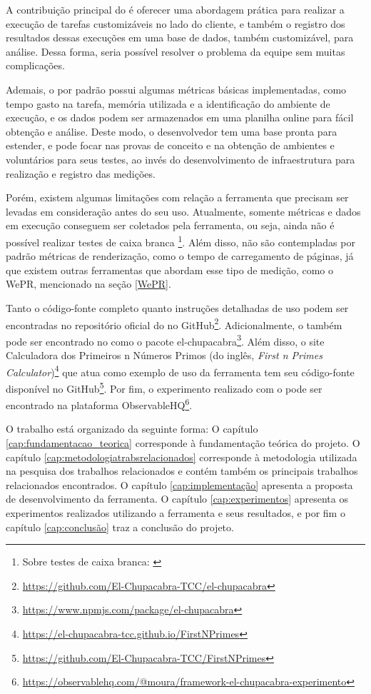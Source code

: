 \documentclass[12pt]{tcc}
\begin{document}
	A contribuição principal do  é oferecer uma abordagem prática para realizar a execução de tarefas customizáveis no lado do cliente, e também o registro dos resultados dessas execuções em uma base de dados, também customizável, para análise. Dessa forma, seria possível resolver o problema da equipe sem muitas complicações. 

	Ademais, o  por padrão possui algumas métricas básicas implementadas, como tempo gasto na tarefa, memória utilizada e a identificação do ambiente de execução, e os dados podem ser armazenados em uma planilha online para fácil obtenção e análise. Deste modo, o desenvolvedor tem uma base pronta para estender, e pode focar nas provas de conceito e na obtenção de ambientes e voluntários para seus testes, ao invés do desenvolvimento de infraestrutura para realização e registro das medições.

	Porém, existem algumas limitações com relação a ferramenta que precisam ser levadas em consideração antes do seu uso. Atualmente, somente métricas e dados em execução conseguem ser coletados pela ferramenta, ou seja, ainda não é possível realizar testes de caixa branca \footnote{Sobre testes de caixa branca: \citep[Capítulo 21]{Sommerville2015Software}}. Além disso, não são contempladas por padrão métricas de renderização, como o tempo de carregamento de páginas, já que existem outras ferramentas que abordam esse tipo de medição, como o WePR, mencionado na seção \ref{WePR}.

	Tanto o código-fonte completo quanto instruções detalhadas de uso podem ser encontradas no repositório oficial do  no GitHub\footnote{\url{https://github.com/El-Chupacabra-TCC/el-chupacabra}}.
	Adicionalmente, o  também pode ser encontrado no  como o pacote el-chupacabra\footnote{\url{https://www.npmjs.com/package/el-chupacabra}}.
	Além disso, o site Calculadora dos Primeiros n Números Primos (do inglês, \emph{First n Primes Calculator})\footnote{\url{https://el-chupacabra-tcc.github.io/FirstNPrimes}} que atua como exemplo de uso da ferramenta tem seu código-fonte disponível no GitHub\footnote{\url{https://github.com/El-Chupacabra-TCC/FirstNPrimes}}.
	Por fim, o experimento realizado com o  pode ser encontrado na plataforma ObservableHQ\footnote{\url{https://observablehq.com/@moura/framework-el-chupacabra-experimento}}.

	O trabalho está organizado da seguinte forma: O capítulo \ref{cap:fundamentacao_teorica} corresponde à fundamentação teórica do projeto. O capítulo \ref{cap:metodologiatrabsrelacionados} corresponde à metodologia utilizada na pesquisa dos trabalhos relacionados e contém também os principais trabalhos relacionados encontrados. O capítulo \ref{cap:implementação} apresenta a proposta de desenvolvimento da ferramenta. O capítulo \ref{cap:experimentos} apresenta os experimentos realizados utilizando a ferramenta e seus resultados, e por fim o capítulo \ref{cap:conclusão} traz a conclusão do projeto.
\end{document}
